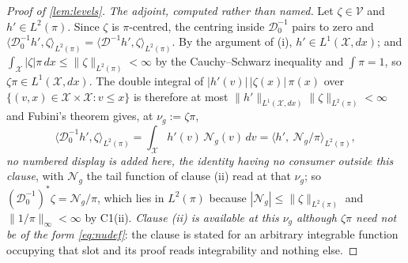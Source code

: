 \begin{proof}[Proof of \cref{lem:levels}]
\emph{The adjoint, computed rather than named.} Let $\zeta\in\mathcal V$ and $h'\in L^{2}(\pi)$. Since
$\zeta$ is $\pi$-centred, the centring inside $\mathcal D^{-1}_0$ pairs to zero and
$\langle\mathcal D^{-1}_0h',\zeta\rangle_{L^{2}(\pi)}=\langle\mathcal D^{-1}h',\zeta\rangle_{L^{2}(\pi)}$.
By the argument of (i), $h'\in L^{1}(\mathcal X,dx)$; and
$\int_{\mathcal X}|\zeta|\pi\,dx\le\|\zeta\|_{L^{2}(\pi)}<\infty$ by the Cauchy--Schwarz inequality and
$\int\pi=1$, so $\zeta\pi\in L^{1}(\mathcal X,dx)$. The double integral of
$|h'(v)|\,|\zeta(x)|\,\pi(x)$ over $\{(v,x)\in\mathcal X\times\mathcal X:v\le x\}$ is therefore at most
$\|h'\|_{L^{1}(\mathcal X,dx)}\|\zeta\|_{L^{2}(\pi)}<\infty$ and Fubini's theorem gives, at
$\nu_g:=\zeta\pi$,
\[
\big\langle\mathcal D^{-1}_0h',\zeta\big\rangle_{L^{2}(\pi)}
=\int_{\mathcal X}h'(v)\,\mathcal N_g(v)\,dv
=\big\langle h',\ \mathcal N_g/\pi\big\rangle_{L^{2}(\pi)},
\]
\emph{no numbered display is added here, the identity having no consumer outside this clause}, with
$\mathcal N_g$ the tail function of clause \textup{(ii)} read at that $\nu_g$; so
$(\mathcal D^{-1}_0)^{\ast}\zeta=\mathcal N_g/\pi$, which lies in $L^{2}(\pi)$ because
$|\mathcal N_g|\le\|\zeta\|_{L^{2}(\pi)}$ and $\|1/\pi\|_\infty<\infty$ by C1(ii).
\emph{Clause \textup{(ii)} is available at this $\nu_g$ although $\zeta\pi$ need not be of the form
\eqref{eq:nudef}}: the clause is stated for an arbitrary integrable function occupying that slot and its
proof reads integrability and nothing else.


\end{proof}
